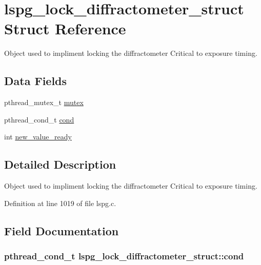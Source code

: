 \hypertarget{structlspg__lock__diffractometer__struct}{\section{lspg\-\_\-lock\-\_\-diffractometer\-\_\-struct Struct Reference}
\label{structlspg__lock__diffractometer__struct}
}


Object used to impliment locking the diffractometer Critical to exposure timing.  


\subsection*{Data Fields}
\begin{DoxyCompactItemize}
\item 
pthread\-\_\-mutex\-\_\-t \hyperlink{structlspg__lock__diffractometer__struct_a362e848dfd1551428b8d12d8776fd2ed}{mutex}
\item 
pthread\-\_\-cond\-\_\-t \hyperlink{structlspg__lock__diffractometer__struct_a7614c802af37c1d3358479a2c13ac898}{cond}
\item 
int \hyperlink{structlspg__lock__diffractometer__struct_ae94acdf44008ce48930e3083f08f5b6c}{new\-\_\-value\-\_\-ready}
\end{DoxyCompactItemize}


\subsection{Detailed Description}
Object used to impliment locking the diffractometer Critical to exposure timing. 

Definition at line 1019 of file lspg.\-c.



\subsection{Field Documentation}
\hypertarget{structlspg__lock__diffractometer__struct_a7614c802af37c1d3358479a2c13ac898}{
\subsubsection[{cond}]{\setlength{\rightskip}{0pt plus 5cm}pthread\-\_\-cond\-\_\-t lspg\-\_\-lock\-\_\-diffractometer\-\_\-struct\-::cond}}\label{structlspg__lock__diffractometer__struct_a7614c802af37c1d3358479a2c13ac898}



